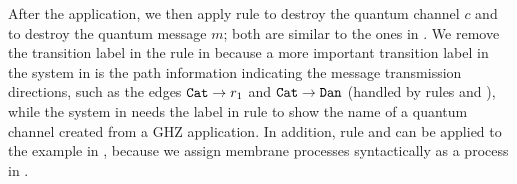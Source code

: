 After the  application, we then apply rule  to destroy the quantum channel $c$ and  to destroy the quantum message $m$; both are similar to the ones in .
We remove the transition label in the  rule in 
because a more important transition label in the system in  is the path information indicating the message transmission directions, such as the edges $\texttt{Cat}\to r_1$ and ${\texttt{Cat}\to \texttt{Dan}}$ (handled by rules  and ),
while the system in  needs the label in rule  to show the name of a quantum channel created from a GHZ application.
In addition, rule  and  can be applied to the example in ,
because we assign membrane processes syntactically as a process in .

